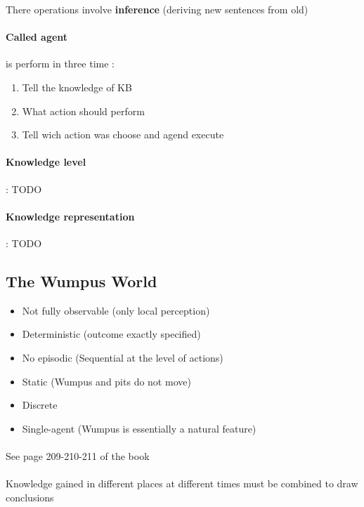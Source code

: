 There operations involve \textbf{inference} (deriving new sentences from old)

\paragraph{Called agent} is perform in three time :
\begin{enumerate}
    \item Tell the knowledge of KB
    \item What action should perform
    \item Tell wich action was choose and agend execute
\end{enumerate}

\paragraph{Knowledge level} :
TODO

\paragraph{Knowledge representation} :
TODO


\subsection{The Wumpus World}

\begin{itemize}
    \item Not fully observable (only local perception)
    \item Deterministic (outcome exactly specified)
    \item No episodic  (Sequential at the level of actions)
    \item Static (Wumpus and pits do not move)
    \item Discrete
    \item Single-agent (Wumpus is essentially a natural feature)
\end{itemize}

\paragraph{ } See page 209-210-211 of the book

\paragraph{ } Knowledge gained in different places at different times must
be combined to draw conclusions


